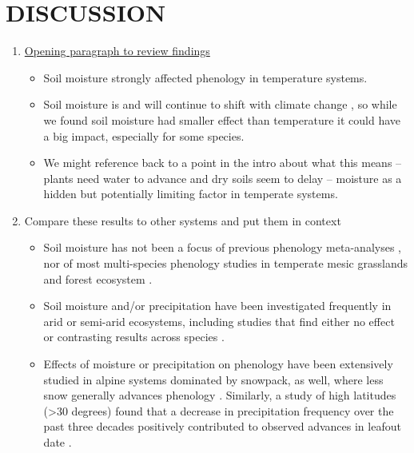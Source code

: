 \documentclass{article}
\begin{document}
\section* {DISCUSSION}

\begin{enumerate}
\item  \underline{Opening paragraph to review findings}
\begin{itemize}
\item Soil moisture strongly affected phenology in temperature systems. 
\item Soil moisture is and will continue to shift with climate change \citep{berg2017}, so while we found soil moisture had smaller effect than temperature it could have a big impact, especially for some species. 
\item We might reference back to a point in the intro about what this means -- plants need water to advance and dry soils seem to delay -- moisture as a hidden but potentially limiting factor in temperate systems. 
\end{itemize}
\item Compare these results to other systems and put them in context 
\begin{itemize}
\item Soil moisture has not been a focus of previous phenology meta-analyses \cite[e.g.,][]{wolkovich2012}, nor of most multi-species phenology studies in temperate mesic grasslands and forest ecosystem \cite[e.g.,][]{Vitass2021}.
\item Soil moisture and/or precipitation have been investigated frequently in arid or semi-arid ecosystems, including studies that find either no effect \citep{howell2020, sherry2007} or contrasting results across species \citep{tao2019}. 
\item Effects of moisture or precipitation on phenology have been extensively studied in alpine systems dominated by snowpack, as well, where less snow generally advances phenology \citep[e.g.,][]{dunne2004,sherwood2017}. Similarly, a study of high latitudes (>30 degrees) found that a decrease in precipitation frequency over the past three decades positively contributed to observed advances in leafout date \citep{wang2022}. %



\end{itemize}
\end{enumerate}
\end{document}
